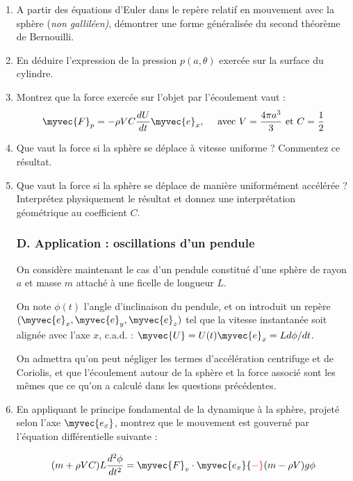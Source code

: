 \begin{enumerate}
\item A partir des équations d'Euler dans le repère relatif en mouvement avec la sphère ({\em non galliléen)}, démontrer une forme généralisée du second théorème de Bernouilli.

\item En déduire l'expression de la pression $p(a,\theta)$ exercée sur la surface du cylindre. 

\item Montrez que la force exercée sur l'objet par l'écoulement vaut :
$$
\myvec{F}_p = - \rho V C  \frac{ dU}{dt} \myvec{e}_x  , \quad \mbox{ avec } V = \frac{4 \pi a^3}{3} \mbox{ et } 
C = \frac{1}{2}
$$

\item Que vaut la force si la sphère se déplace à vitesse uniforme ? Commentez ce résultat.

\item Que vaut la force si la sphère se déplace de manière uniformément accélérée ? Interprétez physiquement le résultat et donnez une interprétation géométrique au coefficient $C$.


\subsubsection*{D. Application : oscillations d'un pendule}

On considère maintenant le cas d'un pendule constitué d'une sphère de rayon $a$ et masse $m$ attaché à une ficelle de longueur $L$. 

On note $\phi(t)$ l'angle d'inclinaison du pendule, et on introduit un repère 
$(\myvec{e}_x, \myvec{e}_y, \myvec{e}_z)$ tel que la vitesse instantanée soit alignée avec l'axe $x$, c.a.d. : $\myvec{U} = U(t) \myvec{e}_x = L d \phi / dt$.

On admettra qu'on peut négliger les termes d'accélération centrifuge et de Coriolis, et que l'écoulement autour de la sphère et la force associé sont les mêmes que ce qu'on a calculé dans les questions précédentes.




\item En appliquant le principe fondamental de la dynamique à la sphère, projeté selon l'axe 
$\myvec{e_x}$, montrez que le mouvement est gouverné par l'équation différentielle suivante :

$$
(m+\rho VC) L
\frac{d^2 \phi}{d t^2} =  \myvec{F}_v \cdot \myvec{e_x} { \color{red} - }  (m-\rho V) g \phi
$$




\end{enumerate}
